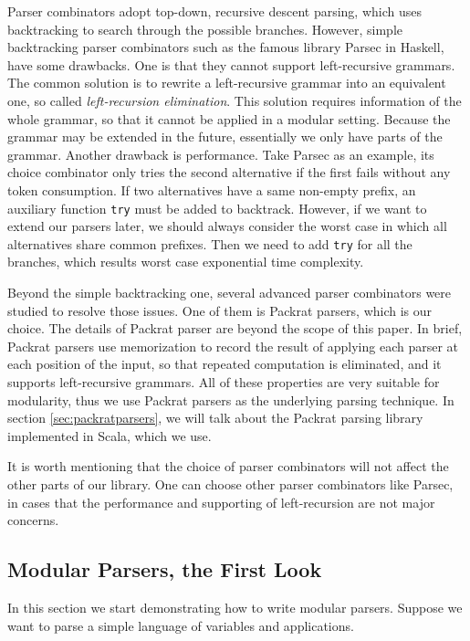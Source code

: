 Parser combinators adopt top-down, recursive descent parsing, which uses backtracking to search through the possible branches. However, simple backtracking parser combinators such as the famous library Parsec in Haskell, have some drawbacks. One is that they cannot support left-recursive grammars. The common solution is to rewrite a left-recursive grammar into an equivalent one, so called \textit{left-recursion elimination}. This solution requires information of the whole grammar, so that it cannot be applied in a modular setting. Because the grammar may be extended in the future, essentially we only have parts of the grammar. Another drawback is performance. Take Parsec as an example, its choice combinator only tries the second alternative if the first fails without any token consumption. If two alternatives have a same non-empty prefix, an auxiliary function \lstinline{try} must be added to backtrack. However, if we want to extend our parsers later, we should always consider the worst case in which all alternatives share common prefixes. Then we need to add \lstinline{try} for all the branches, which results worst case exponential time complexity.

Beyond the simple backtracking one, several advanced parser combinators were studied to resolve those issues. One of them is Packrat parsers, which is our choice. The details of Packrat parser are beyond the scope of this paper. In brief, Packrat parsers use memorization to record the result of applying each parser at each position of the input, so that repeated computation is eliminated, and it supports left-recursive grammars. All of these properties are very suitable for modularity, thus we use Packrat parsers as the underlying parsing technique. In section \ref{sec:packratparsers}, we will talk about the Packrat parsing library implemented in Scala, which we use.

It is worth mentioning that the choice of parser combinators will not affect the other parts of our library. One can choose other parser combinators like Parsec, in cases that the performance and supporting of left-recursion are not major concerns.

\subsection{Modular Parsers, the First Look}\label{subsec:overview-firstlook}

In this section we start demonstrating how to write modular parsers. Suppose we want to parse a simple language of variables and applications.

